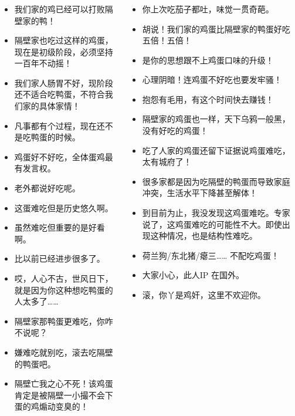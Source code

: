 \documentclass[UTF8,aspectratio=43,11pt,colorlinks,compress,openany]{beamer}%
\begin{document}
\begin{frame}\frametitle{}
\centering{\large\textcolor{red}{“这鸡蛋真难吃。”}}\footnotesize\vspace{-1ex}
\begin{columns}[onlytextwidth]
\begin{itemize}
	\item 我们家的鸡已经可以打败隔壁家的鸭！
	\item 隔壁家也吃过这样的鸡蛋，现在是初级阶段，必须坚持一百年不动摇！
	\item 我们家人肠胃不好，现阶段还不适合吃鸭蛋，不符合我们家的具体家情！
	\item 凡事都有个过程，现在还不是吃鸭蛋的时候。
	\item 鸡蛋好不好吃，全体蛋鸡最有发言权。
	\item 老外都说好吃呢。
	\item 这蛋难吃但是历史悠久啊。
	\item 虽然难吃但重要的是好看啊。
	\item 比以前已经进步很多了。
	\item 哎，人心不古，世风日下，就是因为你这种想吃鸭蛋的人太多了……
	\item 隔壁家那鸭蛋更难吃，你咋不说呢？
	\item 嫌难吃就别吃，滚去吃隔壁的鸭蛋吧。
	\item 隔壁亡我之心不死！该鸡蛋肯定是被隔壁一小撮不会下蛋的鸡煽动变臭的！
\end{itemize}
\begin{itemize}
	\item 你上次吃茄子都吐，味觉一贯奇葩。
	\item 胡说！我们家的鸡蛋比隔壁家的鸭蛋好吃五倍！五倍！
	\item 是你的思想跟不上鸡蛋口味的升级！
	\item 心理阴暗！连鸡蛋不好吃也要发牢骚！
	\item 抱怨有毛用，有这个时间快去赚钱！
	\item 隔壁家的鸡蛋也一样，天下乌鸦一般黑，没有好吃的鸡蛋！
	\item 吃了人家的鸡蛋还留下证据说鸡蛋难吃，太有城府了！
	\item 很多家都是因为吃隔壁的鸭蛋而导致家庭冲突，生活水平下降甚至解体！
	\item 到目前为止，我没发现这鸡蛋难吃。专家说了，这鸡蛋难吃的可能性不大。即使出现这种情况，也是结构性难吃。
	\item 荷兰狗/东北猪/瘪三…… 不配吃鸡蛋！
	\item 大家小心，此人IP 在国外。
	\item 滚，你丫是鸡奸，这里不欢迎你。
\end{itemize}
\end{columns}
\end{frame}
\end{document}
